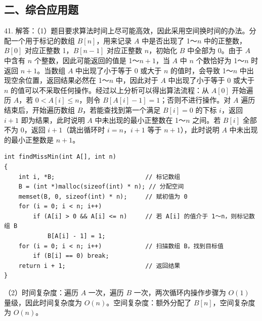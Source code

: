 \documentclass[UTF8,11pt]{ctexart}
\begin{document}
\subsection*{二、综合应用题}

41. 解答：（1）题目要求算法时间上尽可能高效，因此采用空间换时间的办法。分配一个用于标记的数组 \(\displaystyle B[n]\)，用来记录 \(\displaystyle A\) 中是否出现了 1～\(\displaystyle n\) 中的正整数，\(\displaystyle B[0]\) 对应正整数 1，\(\displaystyle B[n-1]\) 对应正整数 \(\displaystyle n\)，初始化 \(\displaystyle B\) 中全部为 0。由于 \(\displaystyle A\) 中含有 \(\displaystyle n\) 个整数，因此可能返回的值是 1～\(\displaystyle n+1\)，当 \(\displaystyle A\) 中 \(\displaystyle n\) 个数恰好为 1～\(\displaystyle n\) 时返回 \(\displaystyle n+1\)。当数组 \(\displaystyle A\) 中出现了小于等于 0 或大于 \(\displaystyle n\) 的值时，会导致 1～\(\displaystyle n\) 中出现空余位置，返回结果必然在 1～\(\displaystyle n\) 中，因此对于 \(\displaystyle A\) 中出现了小于等于 0 或大于 \(\displaystyle n\) 的值可以不采取任何操作。经过以上分析可以得出算法流程：从 \(\displaystyle A[0]\) 开始遍历 \(\displaystyle A\)，若 \(\displaystyle 0<A[i]\leq n\)，则令 \(\displaystyle B[A[i]-1]=1\)；否则不进行操作。对 \(\displaystyle A\) 遍历结束后，开始遍历数组 \(\displaystyle B\)，若能查找到第一个满足 \(\displaystyle B[i]=0\) 的下标 \(\displaystyle i\)，返回 \(\displaystyle i+1\) 即为结果，此时说明 \(\displaystyle A\) 中未出现的最小正整数在 1～\(\displaystyle n\) 之间。若 \(\displaystyle B[i]\) 全部不为 0，返回 \(\displaystyle i+1\)（跳出循环时 \(\displaystyle i=n\)，\(\displaystyle i+1\) 等于 \(\displaystyle n+1\)），此时说明 \(\displaystyle A\) 中未出现的最小正整数是 \(\displaystyle n+1\)。


\begin{Verbatim}[breaklines,breakanywhere,fontsize=\small]
int findMissMin(int A[], int n)
{
    int i, *B;                         // 标记数组
    B = (int *)malloc(sizeof(int) * n); // 分配空间
    memset(B, 0, sizeof(int) * n);     // 赋初值为 0
    for (i = 0; i < n; i++)
        if (A[i] > 0 && A[i] <= n)     // 若 A[i] 的值介于 1～n，则标记数组 B
            B[A[i] - 1] = 1;
    for (i = 0; i < n; i++)            // 扫描数组 B，找到目标值
        if (B[i] == 0) break;
    return i + 1;                      // 返回结果
}

\end{Verbatim}

（2）时间复杂度：遍历 \(\displaystyle A\) 一次，遍历 \(\displaystyle B\) 一次，两次循环内操作步骤为 \(\displaystyle O(1)\) 量级，因此时间复杂度为 \(\displaystyle O(n)\)。空间复杂度：额外分配了 \(\displaystyle B[n]\)，空间复杂度为 \(\displaystyle O(n)\)。
\end{document}
